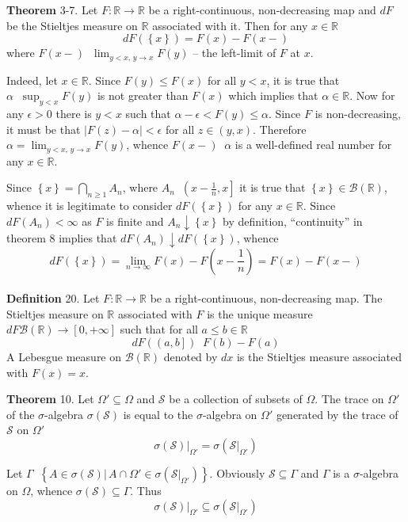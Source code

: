 \documentclass[a4paper]{article}
\newcommand{\obj}[1]{\left\{ #1 \right \}}
\newcommand{\clo}[1]{\left [ #1 \right ]}
\newcommand{\ploc}[1]{\left ( #1 \right ]}
\newcommand{\brac}[1]{\left ( #1 \right )}
\newcommand{\induc}[1]{\left . #1 \right \vert}
\newcommand{\abs}[1]{\left | #1 \right |}
\newcommand{\Real}{\mathbb{R}}
\newcommand{\Zinf}{\clo{ 0, +\infty }}
\newcommand{\Scal}{\mathcal{S}}
\newcommand{\borel}[1]{\mathcal{B}\brac{#1}}
\newcommand{\defn}{\mathop{\overset{\Delta}{=}}\nolimits}
\begin{document}
\label{thm:stieltjes_meas_atom} \noindent \textbf{Theorem} 3-7.
Let $F:\Real\to\Real$ be a right-continuous, non-decreasing map and $dF$ be the Stieltjes measure on $\Real$ associated with it. Then for any $x\in \Real$ \[dF\brac{\obj{x}} = F\brac{x}-F\brac{x-}\] where $F\brac{x-}\defn \lim_{y<x,\,y\to x} F\brac{y}$ -- the left-limit of $F$ at $x$.

Indeed, let $x\in \Real$. Since $F\brac{y}\leq F\brac{x}$ for all $y<x$, it is true that $\alpha\defn \sup_{y<x} F\brac{y}$ is not greater than $F\brac{x}$ which implies that $\alpha\in \Real$. Now for any $\epsilon>0$ there is $y<x$ such that $\alpha-\epsilon<F\brac{y}\leq \alpha$. Since $F$ is non-decreasing, it must be that $\abs{F\brac{z}-\alpha}<\epsilon$ for all $z\in \brac{y,x}$. Therefore $\alpha = \lim_{y<x,\,y\to x} F\brac{y}$, whence $F\brac{x-}\defn \alpha$ is a well-defined real number for any $x\in \Real$.

Since $\obj{x}=\bigcap_{n\geq1} A_n$, where $A_n\defn\ploc{x-\frac{1}{n},x}$ it is true that $\obj{x}\in \borel{\Real}$, whence it is legitimate to consider $dF\brac{\obj{x}}$ for any $x\in \Real$. Since $dF\brac{A_n}<\infty$ as $F$ is finite and $A_n\downarrow \obj{x}$ by definition, ``continuity'' in theorem 8 implies that $dF\brac{A_n}\downarrow dF\brac{\obj{x}}$, whence \[dF\brac{\obj{x}}=\lim_{n\to \infty} F\brac{x}-F\brac{x-\frac{1}{n}} = F\brac{x}-F\brac{x-}\]\\

\noindent \textbf{Definition} 20.
Let $F:\Real\to\Real$ be a right-continuous, non-decreasing map. The Stieltjes measure on $\Real$ associated with $F$ is the unique measure $dF\borel{\Real}\to\Zinf$ such that for all $a\leq b\in \Real$\[dF\brac{\ploc{a,b}}\defn F\brac{b}-F\brac{a}\] A Lebesgue measure on $\borel{\Real}$ denoted by $dx$ is the Stieltjes measure associated with $F\brac{x}=x$.

\label{thm:trace_sigma} \noindent \textbf{Theorem} 10.
Let $\Omega'\subseteq \Omega$ and $\Scal$ be a collection of subsets of $\Omega$. The trace on $\Omega'$ of the $\sigma$-algebra $\sigma\brac{\Scal}$ is equal to the $\sigma$-algebra on $\Omega'$ generated by the trace of $\Scal$ on $\Omega'$\[\induc{\sigma\brac{\Scal}}_{\Omega'} = \sigma\brac{\induc{\Scal}_{\Omega'}}\]

Let $\Gamma\defn \obj{\induc{A\in \sigma\brac{\Scal}}\,A\cap \Omega'\in \sigma\brac{\induc{\Scal}_{\Omega'}}}$. Obviously $\Scal\subseteq\Gamma$ and $\Gamma$ is a $\sigma$-algebra on $\Omega$, whence $\sigma\brac{\Scal}\subseteq\Gamma$. Thus \[\induc{\sigma\brac{\Scal}}_{\Omega'}\subseteq \sigma\brac{\induc{\Scal}_{\Omega'}}\]
\end{document}
